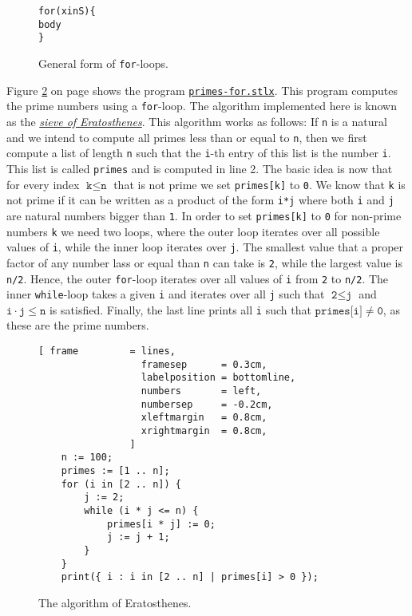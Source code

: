 \begin{figure}[!ht]
  \centering
\begin{alltt}
      for (x in S) \{
          body
      \}
\end{alltt}
\vspace*{-0.3cm}
\caption{General form of \texttt{for}-loops.}  \label{fig:for}
\end{figure} 

Figure  \ref{fig:primes-for.stlx} on page \pageref{fig:primes-for.stlx} shows the program
\href{https://github.com/karlstroetmann/Logik/blob/master/SetlX/primes-for.stlx}{\texttt{primes-for.stlx}}.
This program computes the prime numbers using a  \texttt{for}-loop.  The algorithm implemented here is known as
the \href{https://en.wikipedia.org/wiki/Sieve_of_Eratosthenes}{\emph{sieve of Eratosthenes}}.
This algorithm works as follows:  If \texttt{n} is a natural and we intend to compute all primes less than or
equal to \texttt{n}, then we first compute a list of length \texttt{n} such that the \texttt{i}-th entry of
this list is the number \texttt{i}.  This list is called \texttt{primes} and is computed in line 2.  The basic
idea is now that for every index $\texttt{k} \leq  \texttt{n}$ that is not prime we set \texttt{primes[k]} to
\texttt{0}.  We know that \texttt{k} is not prime if it can be written as a product of the form \texttt{i*j}
where both \texttt{i} and \texttt{j} are natural numbers bigger than \texttt{1}.
In order to set \texttt{primes[k]} to \texttt{0} for non-prime numbers \texttt{k} we need two loops,
where the outer loop iterates over all possible values of \texttt{i}, while the inner loop iterates
over \texttt{j}. The smallest value that a proper factor of any number lass or equal than \texttt{n}
can take is \texttt{2}, while the largest value is \texttt{n/2}.  Hence,
the outer \texttt{for}-loop iterates over all values of \texttt{i} from \texttt{2} to \texttt{n/2}.
The inner \texttt{while}-loop takes a given \texttt{i} and iterates over all \texttt{j}
such that $\texttt{2} \leq \texttt{j}$ and $\texttt{i} \cdot \texttt{j} \leq \mathtt{n}$ is
satisfied.  Finally, the last line prints all \texttt{i} such that  $\texttt{primes[i]} \not= \mathtt{0}$, as these are
the prime numbers.


\begin{figure}[!ht]
  \centering
\begin{Verbatim}[ frame         = lines, 
                  framesep      = 0.3cm, 
                  labelposition = bottomline,
                  numbers       = left,
                  numbersep     = -0.2cm,
                  xleftmargin   = 0.8cm,
                  xrightmargin  = 0.8cm,
                ]
    n := 100;
    primes := [1 .. n];
    for (i in [2 .. n]) {
        j := 2;
        while (i * j <= n) {
            primes[i * j] := 0;
            j := j + 1;
        }
    }
    print({ i : i in [2 .. n] | primes[i] > 0 });
\end{Verbatim} 
\vspace*{-0.3cm}
\caption{The algorithm of Eratosthenes.}  \label{fig:primes-for.stlx}
\end{figure} 

